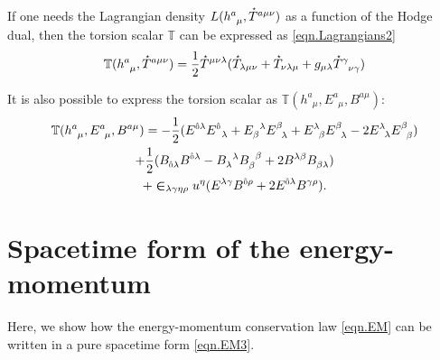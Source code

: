 \documentclass[
10pt, %
a4paper, %
oneside, %
headinclude,footinclude, %
BCOR5mm, %
]{scrartcl}
\newcommand{\tetrsymbol}{h}
\newcommand{\tetr}[2]{\tetrsymbol^{#1}_{\phantom{#1}#2}}
\newcommand{\ET}[2]{E^{#1}_{\phantom{#1}#2}}	%
\newcommand{\ETmix}[2]{E^{#1}_{#2}}	%
\newcommand{\BT}[2]{B^{#1#2}}	%
\newcommand{\BTmix}[2]{B^{#1}_{#2}}	%
\newcommand{\Laghodge}{L}%
\newcommand{\LCsymb}{\bm{\in}}    %
\newcommand{\HDT}[1]{\accentset{\star}{T}^{#1}}
\newcommand{\HDmix}{\accentset{\star}{T}}
\newcommand{\indlat}[1]{\hat{\mathsmaller{#1}}}
\newcommand{\Tscal}{\mathbb{T}}		%
\begin{document}
If one needs the Lagrangian density $ \Laghodge(\tetr{a}{\mu},\HDT{a\mu\nu}) $ as a function of the 
Hodge dual, then the torsion scalar $ \Tscal $ can be expressed as
\eqref{eqn.Lagrangians2}
\begin{equation}\label{eqn.Tscal.Hodge}
	\Tscal(\tetr{a}{\mu},\HDT{a\mu\nu}) = \frac12 \HDT{\mu\nu\lambda} (\HDmix_{\lambda\mu\nu} + 
	\HDmix_{\nu\lambda\mu} + g_{\mu\lambda} \HDmix^{\gamma}_{\phantom{\gamma\,} \nu\gamma})
\end{equation}


It is also possible to express the torsion scalar as $ 
\Tscal(\tetr{a}{\mu},\ET{a}{\mu},\BT{a}{\mu}) $:
\begin{multline}\label{eqn.Tscal.EB}
	\Tscal(\tetr{a}{\mu},\ET{a}{\mu},\BT{a}{\mu}) = 
	-\frac12 (\ETmix{\indlat{0}\lambda}{}\ETmix{\indlat{0}}{\ \,\lambda}   +
		      \ETmix{\ \,\lambda}{\beta} \ETmix{\beta}{\ \,\lambda}  +
			  \ETmix{\lambda}{\ \,\beta}\ETmix{\beta}{\ \,\lambda}   -
			  2\ETmix{\lambda}{\ \,\lambda}\ETmix{\beta}{\ \,\beta} )
			  \\
	+ \frac12 (  \BTmix{}{\indlat{0}\lambda}\BTmix{\indlat{0}\lambda}{}
	           - \BTmix{\ \,\lambda}{\lambda}\BTmix{\ \,\beta}{\beta}
	           + 2\BTmix{\lambda\beta}{}\BTmix{}{\beta\lambda}
	           )
	          \\
	          + \LCsymb_{\lambda\gamma\eta\rho} u^\eta 
	          (\ETmix{\lambda\gamma}{}\BTmix{\indlat{0}\rho}{} + 2 
	          \ET{\indlat{0}\lambda}{}\BTmix{\gamma\rho}{}).
\end{multline}


\appendix


\section{Spacetime form of the energy-momentum}\label{app.sec.EM}

Here, we show how the energy-momentum conservation law \eqref{eqn.EM} can be written in a pure 
spacetime form \eqref{eqn.EM3}.
\end{document}
